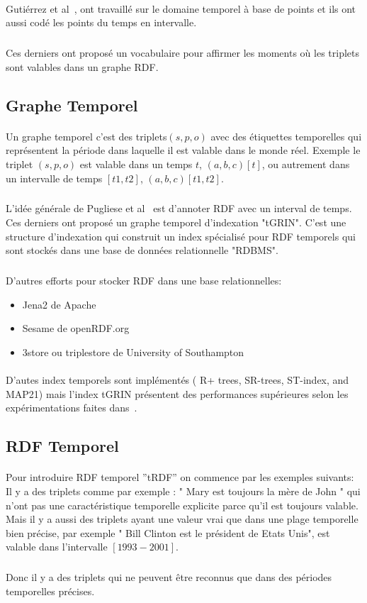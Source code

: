 \paragraph{}
Gutiérrez et al~\cite{gutierrez2007}, ont travaillé sur le domaine temporel à base de points et ils ont aussi codé les points du temps en intervalle.
\subparagraph{}
Ces derniers ont proposé un vocabulaire pour affirmer les moments où les triplets sont valables dans un graphe RDF.
\subsection*{Graphe Temporel}
\paragraph{}
Un graphe temporel c'est des triplets$(s,p,o)$ avec des étiquettes temporelles qui représentent la période dans laquelle il est valable dans le monde réel.
Exemple le triplet $(s,p,o)$ est valable dans un temps $t$, $(a,b,c)[t]$, ou autrement dans un intervalle de temps $[t1,t2]$, $(a,b,c)[t1,t2]$.
\subparagraph{}
L'idée générale de Pugliese et al~\cite{pugliese2008} est d'annoter RDF avec un interval de temps.
Ces derniers ont proposé un graphe temporel d'indexation "tGRIN". C'est une structure d’indexation qui construit un index spécialisé pour RDF temporels qui sont stockés dans une base de données relationnelle "RDBMS".
\subparagraph{}
D’autres efforts pour stocker RDF dans une base relationnelles:
\begin{itemize}
\item Jena2 de Apache
\item Sesame de openRDF.org
\item 3store ou triplestore de University of Southampton
\end{itemize}
\paragraph{}
D'autes index temporels sont implémentés ( R+ trees, SR-trees, ST-index, and MAP21) mais l'index tGRIN présentent des performances supérieures selon les expérimentations faites dans~\cite{pugliese2008}.
\subsection*{RDF Temporel}
\paragraph{}
Pour introduire RDF temporel ''tRDF'' on commence par les exemples suivants:
\newline
Il y a des triplets comme par exemple : " Mary est toujours la mère de John " qui n'ont pas une caractéristique temporelle explicite parce qu'il est toujours valable.
Mais il y a aussi des triplets ayant une valeur vrai que dans une plage temporelle bien précise, par exemple
" Bill Clinton est le président de Etats Unis", est valable dans l'intervalle $[1993-2001]$.   
\subparagraph{}
Donc il y a des triplets qui ne peuvent être reconnus que dans des périodes temporelles précises.
